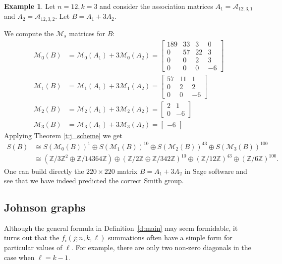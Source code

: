 \documentclass[11pt]{article}
\theoremstyle{definition}
\newtheorem{example}[theo]{Example}
\numberwithin{equation}{section}
\numberwithin{equation}{section}
\newcommand{\Z}[0]{\mathbb{Z}}
\newcommand{\M}{\mathcal{M}}
\newcommand{\A}{\mathcal{A}}
\begin{document}
\begin{example}\label{ex:scheme}
Let $n=12, k=3$ and consider the association matrices $A_1 = \A_{12,3,1}$ and $A_2 = \A_{12,3,2}$.  Let $B = A_1 + 3A_2$.

We compute the $\M_{s}$ matrices for $B$:
\begin{align*}
\M_{0}(B) &= \M_{0}(A_1) + 3\M_{0}(A_2) = \begin{bmatrix}
    189 & 33 & 3 & 0\\
    0 & 57 & 22 & 3\\
    0 & 0 & 2 & 3\\
    0 & 0 & 0 & -6
\end{bmatrix} \\
\M_{1}(B) &= \M_{1}(A_1) + 3\M_{1}(A_2) = \begin{bmatrix}
    57 & 11 & 1\\
    0 & 2 & 2\\
    0 & 0 & -6
\end{bmatrix}\\
\M_{2}(B) &= \M_{2}(A_1) + 3\M_{2}(A_2) = \begin{bmatrix}
    2 & 1\\
    0 & -6
\end{bmatrix} \\
\M_{3}(B) &= \M_{3}(A_1) + 3\M_{3}(A_2) = \begin{bmatrix}
    -6
\end{bmatrix}
\end{align*}
Applying Theorem \ref{t:j_scheme} we get
\begin{align*}
S(B) &\cong S(\M_{0}(B))^{1} \oplus S(\M_{1}(B))^{10} \oplus S(\M_{2}(B))^{43} \oplus S(\M_{3}(B))^{100}\\
&\cong \left ( \Z/3\Z^{2} \oplus \Z/14364\Z \right )
\oplus \left ( \Z/2\Z \oplus \Z/342\Z \right )^{10} 
\oplus \left ( \Z/12\Z \right )^{43}
\oplus \left ( \Z/6\Z \right )^{100}.
\end{align*}
One can build directly the $220 \times 220$ matrix $B = A_{1} + 3A_{2}$ in Sage software \cite{sagemath} and see that we have indeed predicted the correct Smith group.
\end{example}


\subsection{Johnson graphs}

Although the general formula in Definition~\ref{d:main} may seem formidable, it turns out that the $f_i(j; n, k, \ell)$ summations often have a simple form for particular values of $\ell$.  For example, there are only two non-zero diagonals in the case when $\ell = k-1$.
\end{document}
